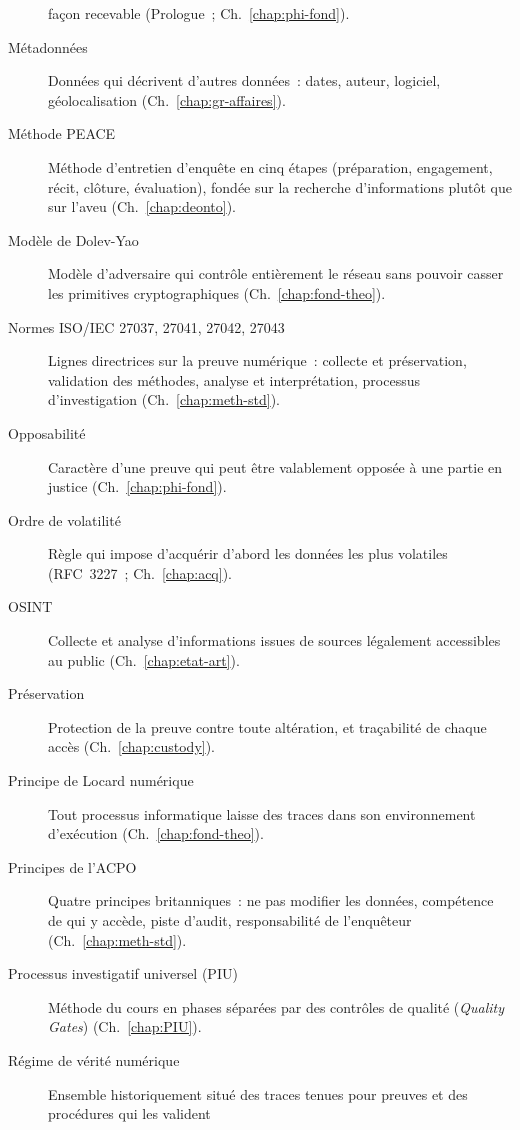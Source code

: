 \begin{description}
          façon recevable (Prologue~; Ch.~\ref{chap:phi-fond}).
    \item[Métadonnées] Données qui décrivent d'autres données~: dates, auteur,
          logiciel, géolocalisation (Ch.~\ref{chap:gr-affaires}).
    \item[Méthode PEACE] Méthode d'entretien d'enquête en cinq étapes
          (préparation, engagement, récit, clôture, évaluation), fondée sur
          la recherche d'informations plutôt que sur l'aveu
          (Ch.~\ref{chap:deonto}).
    \item[Modèle de Dolev-Yao] Modèle d'adversaire qui contrôle entièrement le
          réseau sans pouvoir casser les primitives cryptographiques
          (Ch.~\ref{chap:fond-theo}).
    \item[Normes ISO/IEC 27037, 27041, 27042, 27043] Lignes directrices sur la
          preuve numérique~: collecte et préservation, validation des méthodes,
          analyse et interprétation, processus d'investigation
          (Ch.~\ref{chap:meth-std}).
    \item[Opposabilité] Caractère d'une preuve qui peut être valablement
          opposée à une partie en justice (Ch.~\ref{chap:phi-fond}).
    \item[Ordre de volatilité] Règle qui impose d'acquérir d'abord les données
          les plus volatiles (RFC~3227~; Ch.~\ref{chap:acq}).
    \item[OSINT] Collecte et analyse d'informations issues de sources
          légalement accessibles au public (Ch.~\ref{chap:etat-art}).
    \item[Préservation] Protection de la preuve contre toute altération, et
          traçabilité de chaque accès (Ch.~\ref{chap:custody}).
    \item[Principe de Locard numérique] Tout processus informatique laisse des
          traces dans son environnement d'exécution
          (Ch.~\ref{chap:fond-theo}).
    \item[Principes de l'ACPO] Quatre principes britanniques~: ne pas modifier
          les données, compétence de qui y accède, piste d'audit,
          responsabilité de l'enquêteur (Ch.~\ref{chap:meth-std}).
    \item[Processus investigatif universel (PIU)] Méthode du cours en phases
          séparées par des contrôles de qualité (\textit{Quality Gates})
          (Ch.~\ref{chap:PIU}).
    \item[Régime de vérité numérique] Ensemble historiquement situé des
          traces tenues pour preuves et des procédures qui les valident

\end{description}
